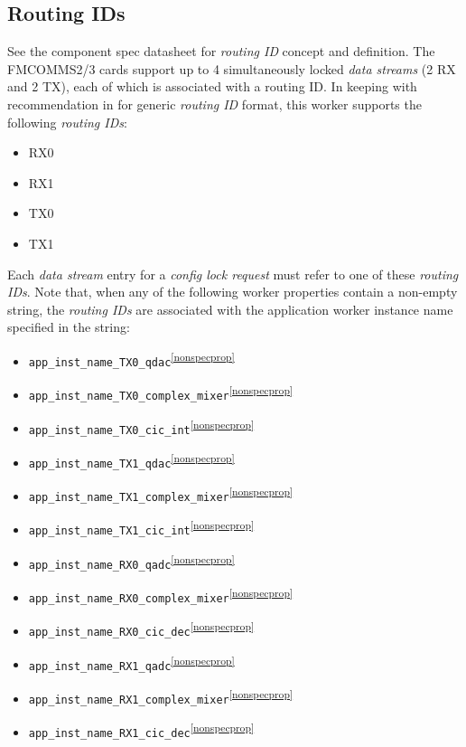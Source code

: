 \documentclass{article}
\begin{document}
  \subsection{Routing IDs}
    See the component spec datasheet for
    \textit{routing ID}
    concept and definition\cite{dig_radio_ctrlr_comp_datasheet}.
    The FMCOMMS2/3 cards support up to 4 simultaneously locked
    \textit{data streams} (2 RX and 2 TX),
    each of which is associated with a routing ID.
    In keeping with recommendation in
    \cite{dig_radio_ctrlr_comp_datasheet} for generic
    \textit{routing ID} format,
    this worker supports the following \textit{routing IDs}:
    \begin{itemize}
      \item RX0
      \item RX1
      \item TX0
      \item TX1
    \end{itemize}
    Each \textit{data stream} entry for a \textit{config lock request} must
    refer to one of these \textit{routing IDs}.
    Note that, when any of the following worker properties contain
    a non-empty string,
    the \textit{routing IDs} are associated with the application worker
    instance name specified in the string:
    \begin{itemize}
      \item \verb+app_inst_name_TX0_qdac+\textsuperscript{\ref{nonspecprop}}
      \item \verb+app_inst_name_TX0_complex_mixer+\textsuperscript{\ref{nonspecprop}}
      \item \verb+app_inst_name_TX0_cic_int+\textsuperscript{\ref{nonspecprop}}
      \item \verb+app_inst_name_TX1_qdac+\textsuperscript{\ref{nonspecprop}}
      \item \verb+app_inst_name_TX1_complex_mixer+\textsuperscript{\ref{nonspecprop}}
      \item \verb+app_inst_name_TX1_cic_int+\textsuperscript{\ref{nonspecprop}}
      \item \verb+app_inst_name_RX0_qadc+\textsuperscript{\ref{nonspecprop}}
      \item \verb+app_inst_name_RX0_complex_mixer+\textsuperscript{\ref{nonspecprop}}
      \item \verb+app_inst_name_RX0_cic_dec+\textsuperscript{\ref{nonspecprop}}
      \item \verb+app_inst_name_RX1_qadc+\textsuperscript{\ref{nonspecprop}}
      \item \verb+app_inst_name_RX1_complex_mixer+\textsuperscript{\ref{nonspecprop}}
      \item \verb+app_inst_name_RX1_cic_dec+\textsuperscript{\ref{nonspecprop}}
    \end{itemize}
\end{document}
